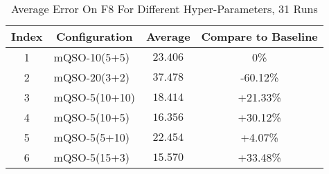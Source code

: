 \begin{table}
  \centering
  \caption{Average Error On F8 For Different Hyper-Parameters, 31 Runs}
  \begin{tabular}{|c|l|c|c|}
    \hline
    Index & \multicolumn{1}{c|}{Configuration} & Average & Compare to Baseline \\
    \hline
    1 & mQSO-10(5+5) & $23.406$ & 0\%\\
    2 & mQSO-20(3+2) & $37.478$ & -60.12\%\\
    3 & mQSO-5(10+10) & $18.414$ & +21.33\%\\
    \hline
    4 & mQSO-5(10+5) & $16.356$ & +30.12\%\\
    5 & mQSO-5(5+10) & $22.454$ & +4.07\%\\
    \hline
    6 & mQSO-5(15+3) & $15.570$ & +33.48\%\\
    \hline
  \end{tabular}
\end{table}
